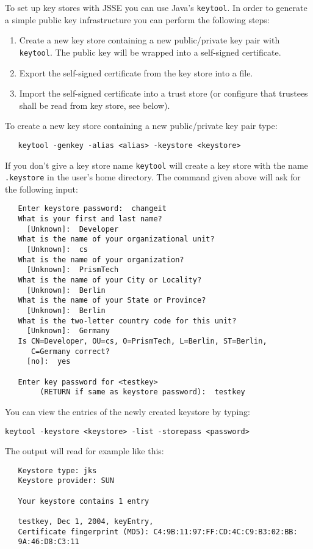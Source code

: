 To set up key stores with JSSE you can use Java's {\tt keytool}.
In  order to  generate  a  simple public  key  infrastructure you  can
perform the following steps:

\begin{enumerate}
\item Create a new key store containing a new public/private key pair
with {\tt keytool}. The public key will be wrapped into a self-signed certificate.
\item Export the self-signed certificate from the key store into a file.
\item Import the self-signed certificate into a trust store
   (or configure that trustees shall be read from key store, see below).
\end{enumerate}
To create a new key store containing a new public/private key pair type:
\begin{verbatim}
   keytool -genkey -alias <alias> -keystore <keystore>
\end{verbatim}
If you don't give a key store name {\tt keytool} will create a key store with
the name {\tt .keystore} in the user's home directory. The command
given above will ask for the following input:
\begin{verbatim}
   Enter keystore password:  changeit
   What is your first and last name?
     [Unknown]:  Developer
   What is the name of your organizational unit?
     [Unknown]:  cs
   What is the name of your organization?
     [Unknown]:  PrismTech
   What is the name of your City or Locality?
     [Unknown]:  Berlin
   What is the name of your State or Province?
     [Unknown]:  Berlin
   What is the two-letter country code for this unit?
     [Unknown]:  Germany
   Is CN=Developer, OU=cs, O=PrismTech, L=Berlin, ST=Berlin,
      C=Germany correct?
     [no]:  yes

   Enter key password for <testkey>
        (RETURN if same as keystore password):  testkey
\end{verbatim}
You can view the entries of the newly created keystore by typing:
\begin{verbatim}
keytool -keystore <keystore> -list -storepass <password>
\end{verbatim}
The output will read for example like this:

\begin{verbatim}
   Keystore type: jks
   Keystore provider: SUN

   Your keystore contains 1 entry

   testkey, Dec 1, 2004, keyEntry,
   Certificate fingerprint (MD5): C4:9B:11:97:FF:CD:4C:C9:B3:02:BB:
   9A:46:D8:C3:11
\end{verbatim}

